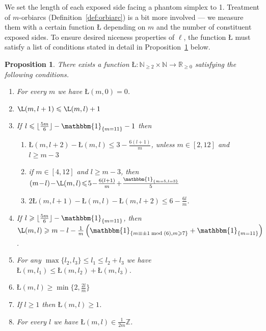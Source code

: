 \documentclass{amsart}
\newtheorem{proposition}[conjecture]{Proposition}
\begin{document}
We set the length of each exposed side facing a phantom simplex to 1. Treatment of $m$-orbiarcs (Definition~\ref{def:orbiarc}) is a bit more involved --- we measure them with a certain function $Ł$ depending on $m$ and the number of constituent exposed sides. To ensure desired niceness properties of $\ell$, the function $Ł$ must satisfy a list of conditions stated in detail in Proposition~\ref{prop:orbilen} below.
\begin{proposition}\label{prop:orbilen}
There exists a function $Ł\colon\mathbb{N}_{\geqslant2}\times\mathbb{N}\to\mathbb{R}_{\geqslant0}$ satisfying the following conditions.
\begin{enumerate}
\item For every $m$ we have $Ł(m,0)=0$.
\item\label{itm:orbi_prop_1lip} $\L(m,l+1)\leqslant\L(m,l)+1$
\item If $l\leqslant\lfloor\tfrac{5m}{6}\rfloor-\mathbbm{1}_{\{m=11\}}-1$ then
\begin{enumerate}
\item\label{itm:orbi_prop_gain_usual} $Ł(m,l+2)-Ł(m,l)\leqslant3-\tfrac{6(l+1)}{m}$, unless $m\in[2,12]$ and $l\geqslant m-3$
\item\label{itm:orbi_prop_gain_except} if $m\!\in\![4,\!12]$ and $l\!\geqslant\!m\!-\!3$, then $(m\!-\!l)\!-\!Ł(m,l)\!\leqslant\!5\!-\!\tfrac{6(l+1)}{m}\!+\!\tfrac{\mathbbm{1}_{\{m=5,l=3\}}}{5}$
\item\label{itm:orbi_prop_gain_2der} $2Ł(m,l+1)-Ł(m,l)-Ł(m,l+2)\leqslant6-\tfrac{6l}{m}$.
\end{enumerate}
\item\label{itm:orbi_prop_loa} If $l\geqslant\lfloor\tfrac{5m}{6}\rfloor-\mathbbm{1}_{\{m=11\}}$, then $\L(m,l)\geqslant m-l-\tfrac{1}{m}\left(\mathbbm{1}_{\{m\equiv\pm1\bmod(6),m\geqslant7\}}+\mathbbm{1}_{\{m=11\}}\right)$.
\item\label{itm:orbi_prop_subadd} For any $\max\{l_2,l_3\}\leqslant l_1\leqslant l_2+l_3$ we have $Ł(m,l_1)\leqslant Ł(m,l_2)+Ł(m,l_3)$.
\item\label{itm:orbi_prop_circlen_dft} $Ł(m,l)\geqslant\min\{2,\tfrac{2l}{m}\}$
\item\label{itm:orbi_prop_atleast1} If $l\geqslant1$ then $Ł(m,l)\geqslant1$.
\item\label{itm:orbi_prop_denominator} For every $l$ we have $Ł(m,l)\in\tfrac{1}{2m}\mathbb{Z}$.
\end{enumerate}
\end{proposition}
\end{document}
